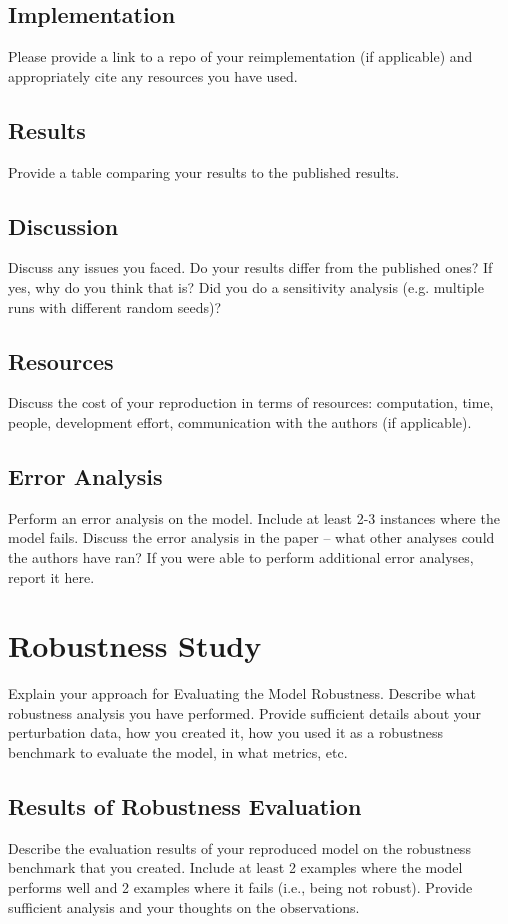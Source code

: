 \documentclass[11pt,a4paper]{article}
\begin{document}
\subsection{Implementation} 
Please provide a link to a repo of your reimplementation (if applicable) and appropriately cite any resources you have used.

\subsection{Results}
Provide a table comparing your results to the published results.

\subsection{Discussion}
Discuss any issues you faced. Do your results differ from the published ones? If yes, why do you think that is? Did you do a sensitivity analysis (e.g. multiple runs with different random seeds)?

\subsection{Resources}
Discuss the cost of your reproduction in terms of resources: computation, time, people, development effort, communication with the authors (if applicable).


\subsection{Error Analysis}
Perform an error analysis on the model. Include at least 2-3 instances where the model fails. Discuss the error analysis in the paper -- what other analyses could the authors have ran? If you were able to perform additional error analyses, report it here.

\section{Robustness Study}
Explain your approach for Evaluating the Model Robustness. Describe what robustness analysis you have performed. Provide sufficient details about your perturbation data, how you created it, how you used it as a robustness benchmark to evaluate the model, in what metrics, etc.

\subsection{Results of Robustness Evaluation}
Describe the evaluation results of your reproduced model on the robustness benchmark that you created. Include at least 2 examples where the model performs well and 2 examples where it fails (i.e., being not robust). Provide sufficient analysis and your thoughts on the observations.
\end{document}
